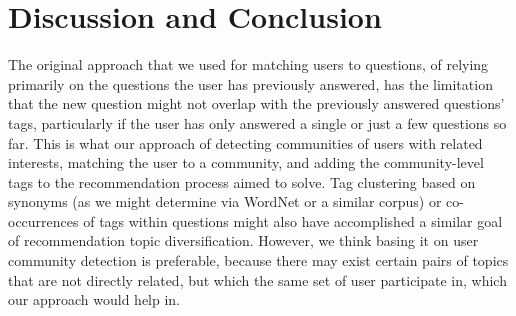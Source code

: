 \documentclass[a4paper]{article}
\begin{document}

\section{Discussion and Conclusion}

The original approach that we used for matching users to questions, of relying primarily on the questions the user has previously answered, has the limitation that the new question might not overlap with the previously answered questions' tags, particularly if the user has only answered a single or just a few questions so far. This is what our approach of detecting communities of users with related interests, matching the user to a community, and adding the community-level tags to the recommendation process aimed to solve. Tag clustering based on synonyms (as we might determine via WordNet \cite{wordnet} or a similar corpus) or co-occurrences of tags within questions might also have accomplished a similar goal of recommendation topic diversification. However, we think basing it on user community detection is preferable, because there may exist certain pairs of topics that are not directly related, but which the same set of user participate in, which our approach would help in. %


\end{document}
